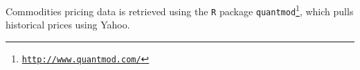 \documentclass{article}
\begin{document}
Commodities pricing data is retrieved using the \texttt{R} package \texttt{quantmod}\footnote{\hyperref[http://www.quantmod.com/]{\texttt{http://www.quantmod.com/}}}, which pulls historical prices using Yahoo.






\end{document}
